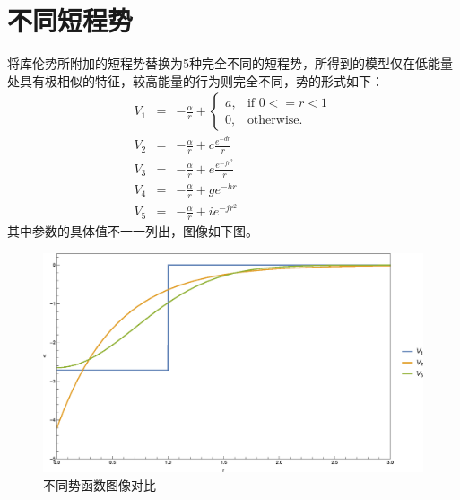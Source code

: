 \documentclass[hyperref,cs4size,titlepage,twoside]{ctexart}
\begin{document}
\section{不同短程势}
将库伦势所附加的短程势替换为5种完全不同的短程势，所得到的模型仅在低能量处具有极相似的特征，较高能量的行为则完全不同，势的形式如下：
\begin{eqnarray}
V_1&=&-\frac{\alpha}{r}+\begin{cases}
                          a, & \mbox{if } 0<=r<1 \\
                          0, & \mbox{otherwise}.
                        \end{cases}\\
V_2&=&-\frac{\alpha}{r}+c \frac{e^{-dr}}{r}\\
V_3&=&-\frac{\alpha}{r}+e \frac{e^{-fr^2}}{r}\\
V_4&=&-\frac{\alpha}{r}+g e^{-hr}\\
V_5&=&-\frac{\alpha}{r}+ie^{-jr^2}
\end{eqnarray}
其中参数的具体值不一一列出，图像如下图。
\begin{figure}[!htbp]
  \centering
  \includegraphics[width=6in]{MultiplePotential.eps}
  \caption{不同势函数图像对比}
\end{figure}
\end{document}
